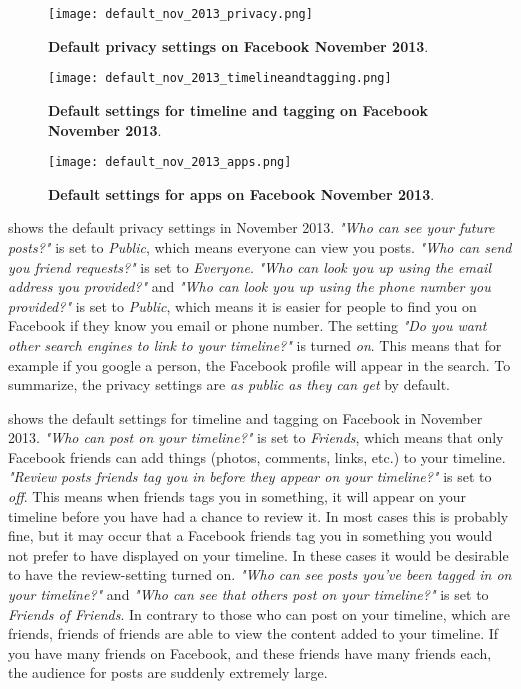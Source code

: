 \begin{figure}[t]
\centering
\texttt{[image: default\_nov\_2013\_privacy.png]}
\caption[Default privacy settings on Facebook November 2013]{\textbf{Default privacy settings on Facebook November 2013}.} 
\label{fig:privacy2013}
\end{figure}

\begin{figure}[b]
\centering
\texttt{[image: default\_nov\_2013\_timelineandtagging.png]}
\caption[Default settings for timeline and tagging on Facebook November 2013]{\textbf{Default settings for timeline and tagging on Facebook November 2013}.} 
\label{fig:timelineandtagging2013}
\end{figure}

\begin{figure}[t]
\centering
\texttt{[image: default\_nov\_2013\_apps.png]}
\caption[Default settings for apps on Facebook November 2013]{\textbf{Default  settings for apps on Facebook November 2013}.} 
\label{fig:apps2013}
\end{figure}

 shows the default privacy settings in November 2013.  \textit{"Who can see your future posts?"} is set to \textit{Public}, which means everyone can view you posts. \textit{"Who can send you friend requests?"} is set to \textit{Everyone}. \textit{"Who can look you up using the email address you provided?"} and \textit{"Who can look you up using the phone number you provided?"} is set to \textit{Public}, which means it is easier for people to find you on Facebook if they know you email or phone number. The setting \textit{"Do you want other search engines to link to your timeline?"} is turned \textit{on}. This means that for example if you google a person, the Facebook profile will appear in the search. To summarize, the privacy settings are \textit{as public as they can get} by default. 

 shows the default settings for timeline and tagging on Facebook in November 2013. \textit{"Who can post on your timeline?"} is set to \textit{Friends}, which means that only Facebook friends can add things (photos, comments, links, etc.) to your timeline. \textit{"Review posts friends tag you in before they appear on your timeline?" }is set to\textit{ off}. This means when friends tags you in something, it will appear on your timeline before you have had a chance to review it. In most cases this is probably fine, but it may occur that a Facebook friends tag you in something you would not prefer to have displayed on your timeline. In these cases it would be desirable to have the review-setting turned on. \textit{"Who can see posts you've been tagged in on your timeline?"} and \textit{"Who can see that others post on your timeline?"} is set to \textit{Friends of Friends}. In contrary to those who can post on your timeline, which are friends, friends of friends are able to view the content added to your timeline. If you have many friends on Facebook, and these friends have many friends each, the audience for posts are suddenly extremely large. 

